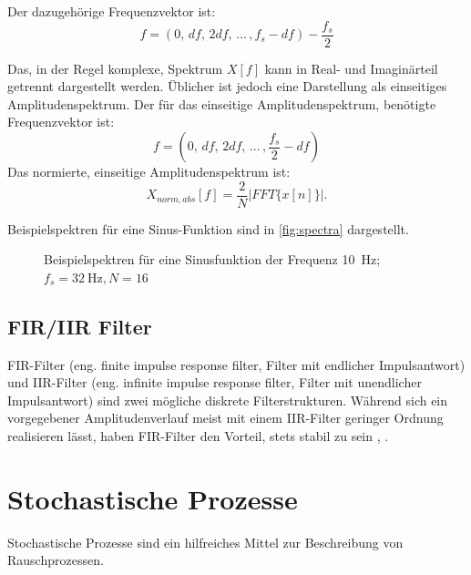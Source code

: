 Der dazugehörige Frequenzvektor ist:
\begin{equation}
	f=(0,\, df,\, 2df,\, \dots \,, f_s-df)-\frac{f_s}{2}
\end{equation}

Das, in der Regel komplexe, Spektrum $X[f]$ kann in Real- und Imaginärteil getrennt dargestellt werden. Üblicher ist jedoch eine Darstellung als einseitiges Amplitudenspektrum. Der für das einseitige Amplitudenspektrum, benötigte Frequenzvektor ist:
\begin{equation}
f=(0,\, df,\, 2df,\, \dots \,, \frac{f_s}{2}-df)
\end{equation}
Das normierte, einseitige Amplitudenspektrum ist:
\begin{equation}
X_{norm,abs}[f]=\frac{2}{N} |FFT\{x[n]\}|.
\end{equation}

Beispielspektren für eine Sinus-Funktion sind in \autoref{fig:spectra} dargestellt.

\begin{figure}[H]
	\centering
	\hfill
	\hfill
	\caption[Spektrum Sinusfunktion]{Beispielspektren für eine Sinusfunktion der Frequenz \SI{10}{\hertz}; $f_s=\SI{32}{\hertz}, N=16$}
	\label{fig:spectra}
\end{figure}

\subsection{FIR/IIR Filter}
FIR-Filter (eng. finite impulse response filter, Filter mit endlicher Impulsantwort) und IIR-Filter (eng. infinite impulse response filter, Filter mit unendlicher Impulsantwort) sind zwei mögliche diskrete Filterstrukturen. Während sich ein vorgegebener Amplitudenverlauf meist mit einem IIR-Filter geringer Ordnung realisieren lässt, haben FIR-Filter den Vorteil, stets stabil zu sein \cite{Schmidt2014}, \cite{Thyagarajan2019}.

\section{Stochastische Prozesse}
Stochastische Prozesse sind ein hilfreiches Mittel zur Beschreibung von Rauschprozessen.

